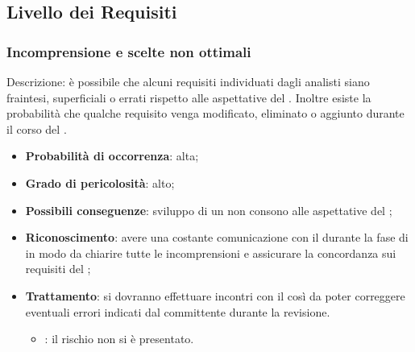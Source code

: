\documentclass[PianoDiProgetto.tex]{subfiles}
\begin{document}
	\subsection{Livello dei Requisiti}
		\subsubsection{Incomprensione e scelte non ottimali}
			\label{sec:lr}
Descrizione: è possibile che alcuni requisiti individuati dagli analisti siano fraintesi, superficiali o errati rispetto alle aspettative del  \PROPONENTE{}. Inoltre esiste la probabilità che qualche requisito venga modificato, eliminato o aggiunto durante il corso del .

		\begin{itemize}
		\item \textbf{Probabilità di occorrenza}: alta;
		\item \textbf{Grado di pericolosità}: alto;
		\item \textbf{Possibili conseguenze}: sviluppo di un  non consono alle aspettative del ;
		\item \textbf{Riconoscimento}: avere una costante comunicazione con il  \PROPONENTE{} durante la fase di \ARdoc{} in modo da chiarire tutte le incomprensioni e assicurare la concordanza sui requisiti del ;
		\item \textbf{Trattamento}: si dovranno effettuare incontri con il  \PROPONENTE{} così da poter correggere eventuali errori indicati dal committente durante la revisione.
		\begin{itemize}
				\item \ARdoc : il rischio non si è presentato.
		\end{itemize}
	\end{itemize}	
	
\end{document}

